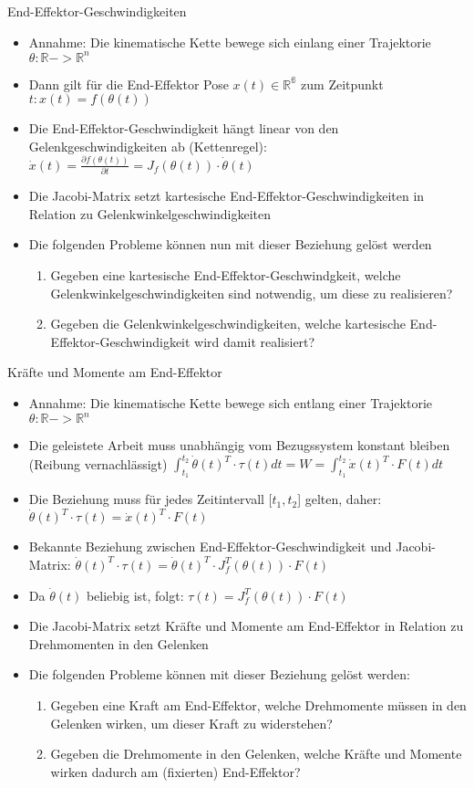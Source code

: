 \documentclass[paper=a4, fontsize=11pt]{scrartcl} %
\numberwithin{equation}{section} %
\numberwithin{figure}{section} %
\numberwithin{table}{section} %
\begin{document}
End-Effektor-Geschwindigkeiten
\begin{itemize}
\item Annahme: Die kinematische Kette bewege sich einlang einer Trajektorie $\theta: \mathbb{R} -> \mathbb{R}^n$
\item Dann gilt für die End-Effektor Pose $x(t) \in \mathbb{R^6}$ zum Zeitpunkt $t: x(t) = f(\theta(t))$
\item Die End-Effektor-Geschwindigkeit hängt linear von den Gelenkgeschwindigkeiten ab (Kettenregel): $\dot{x}(t) = \frac{\partial{f}(\theta(t))}{\partial{t}} = J_f(\theta(t)) \cdot \dot \theta(t) $
\item Die Jacobi-Matrix setzt kartesische End-Effektor-Geschwindigkeiten in Relation zu Gelenkwinkelgeschwindigkeiten
\item Die folgenden Probleme können nun mit dieser Beziehung gelöst werden
\begin{enumerate}
\item Gegeben eine kartesische End-Effektor-Geschwindgkeit, welche Gelenkwinkelgeschwindigkeiten sind notwendig, um diese zu realisieren?
\item Gegeben die Gelenkwinkelgeschwindigkeiten, welche kartesische End-Effektor-Geschwindigkeit wird damit realisiert?
\end{enumerate}
\end{itemize}

Kräfte und Momente am End-Effektor
\begin{itemize}
\item Annahme: Die kinematische Kette bewege sich entlang einer Trajektorie $\theta: \mathbb{R} -> \mathbb{R}^n$
\item Die geleistete Arbeit muss unabhängig vom Bezugssystem konstant bleiben (Reibung vernachlässigt) $\int_{t_1}^{t_2} \dot{\theta}(t)^T \cdot \tau(t)dt = W = \int_{t_1}^{t_2} \dot x(t)^T \cdot F(t) dt$
\item Die Beziehung muss für jedes Zeitintervall [$t_1,t_2$] gelten, daher: $\dot \theta(t)^T \cdot \tau(t) = \dot x(t)^T \cdot F(t)$
\item Bekannte Beziehung zwischen End-Effektor-Geschwindigkeit und Jacobi-Matrix: $\dot \theta(t)^T \cdot \tau(t) = \dot \theta(t)^T \cdot J_f^T(\theta(t)) \cdot F(t)$
\item Da $\dot \theta(t)$ beliebig ist, folgt: $\tau(t) = J_f^T(\theta(t)) \cdot F(t)$
\item Die Jacobi-Matrix setzt Kräfte und Momente am End-Effektor in Relation zu Drehmomenten in den Gelenken
\item Die folgenden Probleme können mit dieser Beziehung gelöst werden:
\begin{enumerate}
\item Gegeben eine Kraft am End-Effektor, welche Drehmomente müssen in den Gelenken wirken, um dieser Kraft zu widerstehen?
\item Gegeben die Drehmomente in den Gelenken, welche Kräfte und Momente wirken dadurch am (fixierten) End-Effektor?
\end{enumerate}
\end{itemize}
\end{document}
